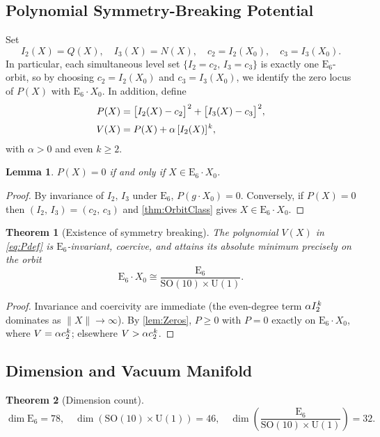 \documentclass[pdflatex,sn-mathphys-num]{sn-jnl}
\theoremstyle{thmstyleone}
\newtheorem{theorem}{Theorem}
\newtheorem{lemma}[lemma]{Lemma}
\theoremstyle{thmstyletwo}%
\theoremstyle{thmstylethree}%
\newcommand{\SO}[1]{\mathrm{SO(#1)}}
\newcommand{\U}[1]{\mathrm{U(#1)}}
\newcommand{\E}[1]{\mathrm{E_{#1}}}
\newcommand{\SOTen}{\SO{10}}
\newcommand{\UOne}{\U{1}}
\newcommand{\ESix}{\E{6}}
\newcommand{\SOTenXUOne}{\SOTen \times \UOne}
\newcommand{\MCoset}{\frac{\ESix}{\SOTenXUOne}}
\newcommand{\sm}{\hspace{.065em}}
\newcommand{\smexp}[1]{^{\sm #1}}
\begin{document}
\subsection{Polynomial Symmetry-Breaking Potential}\label{subsec:PolyPot}
Set
\[
  I_{2}(X)=Q(X),
  \quad
  I_{3}(X)=N(X),
  \quad
  c_{2}=I_{2}(X_{0}),
  \quad
  c_{3}=I_{3}(X_{0}).
\]
In particular, each simultaneous level set $\{I_{2}=c_{2},\,I_{3}=c_{3}\}$ is exactly one $\ESix$-orbit, so by choosing $c_{2}=I_{2}(X_{0})$ and $c_{3}=I_{3}(X_{0})$, we identify the zero locus of $P(X)$ with $\ESix \cdot X_{0}$. In addition, define
\begin{equation}\label{eq:Pdef}
\begin{aligned}
  P(X)
  &=\bigl[I_{2}(X)-c_{2}\bigr]\smexp{2}
  +\bigl[I_{3}(X)-c_{3}\bigr]\smexp{2},\\[2pt]
  V(X)
  &=P(X)
  +\alpha\,[I_{2}(X)]\smexp{k},
\end{aligned}
\end{equation}
with $\alpha>0$ and even $k\ge2$.

\begin{lemma}\label{lem:Zeros}
$P(X)=0$ if and only if $X\in\ESix\cdot X_{0}$.
\end{lemma}

\begin{proof}
By invariance of $I_{2},\,I_{3}$ under $\ESix$, $P(g\cdot X_{0})=0$.  Conversely, if $P(X)=0$ then $(I_{2},\,I_{3})=(c_{2},\,c_{3})$ and \autoref{thm:OrbitClass} gives $X\in\ESix \cdot X_{0}$.
\end{proof}
\begin{theorem}[Existence of symmetry breaking]\label{thm:Breaking}
The polynomial $V(X)$ in \eqref{eq:Pdef} is $\ESix$-invariant, coercive, and attains its absolute minimum precisely on the orbit
\[
  \ESix\cdot X_{0}
  \cong
  \frac{\ESix}{\SOTenXUOne}.
\]
\end{theorem}

\begin{proof}
Invariance and coercivity are immediate (the even-degree term $\alpha I_{2}\smexp{k}$ dominates as $\|X\|\to\infty$).  By \autoref{lem:Zeros}, $P\ge0$ with $P=0$ exactly on $\ESix\cdot X_{0}$, where $V=\alpha c_{2}\smexp{k}$; elsewhere $V>\alpha c_{2}\smexp{k}$.
\end{proof}

\subsection{Dimension and Vacuum Manifold}\label{subsec:Vacuum}
\begin{theorem}[Dimension count]\label{thm:DimCount}
\[
  \dim \ESix=78,
  \quad
  \dim (\SOTenXUOne)=46,
  \quad
  \dim \left(\MCoset\right)=32.
\]
\end{theorem}
\end{document}
